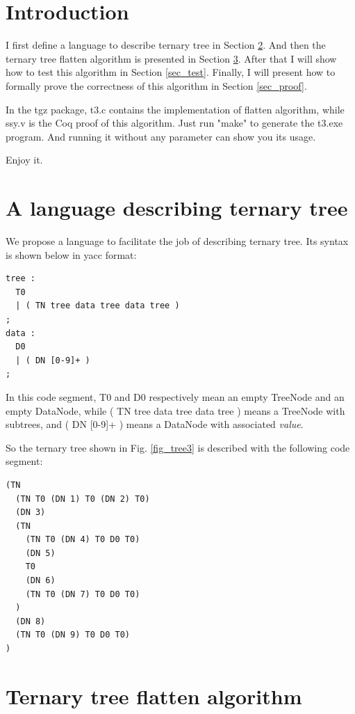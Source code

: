 \documentclass[runningheads,a4paper]{llncs}
\begin{document}
\section{Introduction}

I first define  a language to describe ternary tree in Section \ref{sec_lang}.
And then the ternary tree flatten algorithm is presented in Section \ref{sec_imp}.
After that I will show how to test this algorithm in Section \ref{sec_test}.
Finally,
I will present how to formally prove the correctness of this algorithm in 
Section \ref{sec_proof}.

In the tgz package,
t3.c contains the implementation of flatten algorithm,
while ssy.v is the Coq\cite{coq} proof of this algorithm.
Just run "make" to generate the t3.exe program.
And running it without any parameter can show you its usage.

Enjoy it.

\section{A language describing ternary tree}\label{sec_lang}

We propose a language to facilitate the job of describing ternary tree.
Its syntax is shown below in yacc\cite{yacc} format:

\begin{lstlisting}
tree :
  T0
  | ( TN tree data tree data tree )
;
data :
  D0 
  | ( DN [0-9]+ )
;
\end{lstlisting}

In this code segment,
T0 and D0 respectively mean an empty TreeNode and an empty DataNode,
while ( TN tree data tree data tree ) means a TreeNode with subtrees,
and ( DN [0-9]+ ) means a DataNode with associated \emph{value}.

So the ternary tree shown in Fig. \ref{fig_tree3} is described with the following code segment:

\begin{lstlisting}
(TN
  (TN T0 (DN 1) T0 (DN 2) T0)
  (DN 3)
  (TN
    (TN T0 (DN 4) T0 D0 T0)
    (DN 5)
    T0
    (DN 6)
    (TN T0 (DN 7) T0 D0 T0)
  )
  (DN 8)
  (TN T0 (DN 9) T0 D0 T0)
)
\end{lstlisting}


\section{Ternary tree flatten algorithm}\label{sec_imp}
\end{document}
